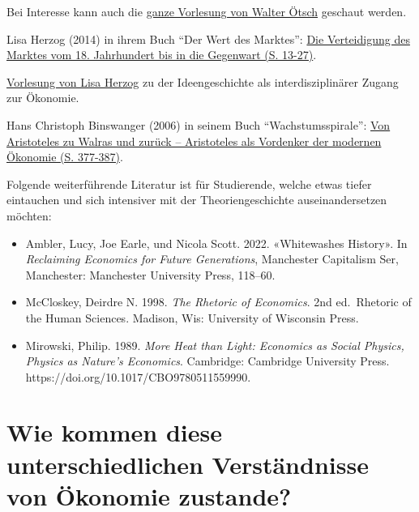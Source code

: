 \documentclass[
  nswissgerman,
  a4paper,
  DIV=11,
  numbers=noendperiod,
  oneside,
  openany]{scrreprt}
\providecommand{\tightlist}{%
  \setlength{\itemsep}{0pt}\setlength{\parskip}{0pt}}
\begin{document}
\begin{tcolorbox}[enhanced jigsaw, arc=.35mm, bottomrule=.15mm, bottomtitle=1mm, breakable, colback=white, colbacktitle=quarto-callout-caution-color!10!white, colframe=quarto-callout-caution-color-frame, coltitle=black, left=2mm, leftrule=.75mm, opacityback=0, opacitybacktitle=0.6, rightrule=.15mm, title={Weiterführende Literatur}, titlerule=0mm, toprule=.15mm, toptitle=1mm]

Bei Interesse kann auch die
\href{https://www.youtube.com/watch?v=zS3QgFE5ASE}{ganze Vorlesung von
Walter Ötsch} geschaut werden.

Lisa Herzog (2014) in ihrem Buch ``Der Wert des Marktes'':
\href{https://ilias.unibe.ch/go/file/3803489}{Die Verteidigung des
Marktes vom 18. Jahrhundert bis in die Gegenwart (S. 13-27)}.

\href{https://www.youtube.com/watch?v=kgAKCvhDHIw}{Vorlesung von Lisa
Herzog} zu der Ideengeschichte als interdisziplinärer Zugang zur
Ökonomie.

Hans Christoph Binswanger (2006) in seinem Buch ``Wachstumsspirale'':
\href{https://ilias.unibe.ch/go/file/3803487}{Von Aristoteles zu Walras
und zurück -- Aristoteles als Vordenker der modernen Ökonomie (S.
377-387)}.

Folgende weiterführende Literatur ist für Studierende, welche etwas
tiefer eintauchen und sich intensiver mit der Theoriengeschichte
auseinandersetzen möchten:

\begin{itemize}
\tightlist
\item
  Ambler, Lucy, Joe Earle, und Nicola Scott. 2022. «Whitewashes
  History». In \emph{Reclaiming Economics for Future Generations},
  Manchester Capitalism Ser, Manchester: Manchester University Press,
  118--60.
\item
  McCloskey, Deirdre N. 1998. \emph{The Rhetoric of Economics}. 2nd
  ed.~Rhetoric of the Human Sciences. Madison, Wis: University of
  Wisconsin Press.
\item
  Mirowski, Philip. 1989. \emph{More Heat than Light: Economics as
  Social Physics, Physics as Nature's Economics}. Cambridge: Cambridge
  University Press. https://doi.org/10.1017/CBO9780511559990.
\end{itemize}

\end{tcolorbox}

\section{Wie kommen diese unterschiedlichen Verständnisse von Ökonomie
zustande?}\label{wie-kommen-diese-unterschiedlichen-verstuxe4ndnisse-von-uxf6konomie-zustande}
\end{document}
